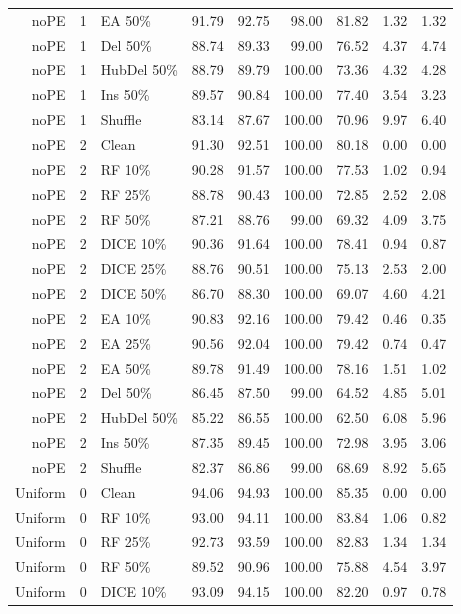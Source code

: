 {\begin{longtable}{rllrrrrrr}
noPE & 1 & EA 50\% & 91.79 & 92.75 & 98.00 & 81.82 & 1.32 & 1.32 \\
noPE & 1 & Del 50\% & 88.74 & 89.33 & 99.00 & 76.52 & 4.37 & 4.74 \\
noPE & 1 & HubDel 50\% & 88.79 & 89.79 & 100.00 & 73.36 & 4.32 & 4.28 \\
noPE & 1 & Ins 50\% & 89.57 & 90.84 & 100.00 & 77.40 & 3.54 & 3.23 \\
noPE & 1 & Shuffle & 83.14 & 87.67 & 100.00 & 70.96 & 9.97 & 6.40 \\
noPE & 2 & Clean & 91.30 & 92.51 & 100.00 & 80.18 & 0.00 & 0.00 \\
noPE & 2 & RF 10\% & 90.28 & 91.57 & 100.00 & 77.53 & 1.02 & 0.94 \\
noPE & 2 & RF 25\% & 88.78 & 90.43 & 100.00 & 72.85 & 2.52 & 2.08 \\
noPE & 2 & RF 50\% & 87.21 & 88.76 & 99.00 & 69.32 & 4.09 & 3.75 \\
noPE & 2 & DICE 10\% & 90.36 & 91.64 & 100.00 & 78.41 & 0.94 & 0.87 \\
noPE & 2 & DICE 25\% & 88.76 & 90.51 & 100.00 & 75.13 & 2.53 & 2.00 \\
noPE & 2 & DICE 50\% & 86.70 & 88.30 & 100.00 & 69.07 & 4.60 & 4.21 \\
noPE & 2 & EA 10\% & 90.83 & 92.16 & 100.00 & 79.42 & 0.46 & 0.35 \\
noPE & 2 & EA 25\% & 90.56 & 92.04 & 100.00 & 79.42 & 0.74 & 0.47 \\
noPE & 2 & EA 50\% & 89.78 & 91.49 & 100.00 & 78.16 & 1.51 & 1.02 \\
noPE & 2 & Del 50\% & 86.45 & 87.50 & 99.00 & 64.52 & 4.85 & 5.01 \\
noPE & 2 & HubDel 50\% & 85.22 & 86.55 & 100.00 & 62.50 & 6.08 & 5.96 \\
noPE & 2 & Ins 50\% & 87.35 & 89.45 & 100.00 & 72.98 & 3.95 & 3.06 \\
noPE & 2 & Shuffle & 82.37 & 86.86 & 99.00 & 68.69 & 8.92 & 5.65 \\
Uniform & 0 & Clean & 94.06 & 94.93 & 100.00 & 85.35 & 0.00 & 0.00 \\
Uniform & 0 & RF 10\% & 93.00 & 94.11 & 100.00 & 83.84 & 1.06 & 0.82 \\
Uniform & 0 & RF 25\% & 92.73 & 93.59 & 100.00 & 82.83 & 1.34 & 1.34 \\
Uniform & 0 & RF 50\% & 89.52 & 90.96 & 100.00 & 75.88 & 4.54 & 3.97 \\
Uniform & 0 & DICE 10\% & 93.09 & 94.15 & 100.00 & 82.20 & 0.97 & 0.78 \\

\end{longtable}}
